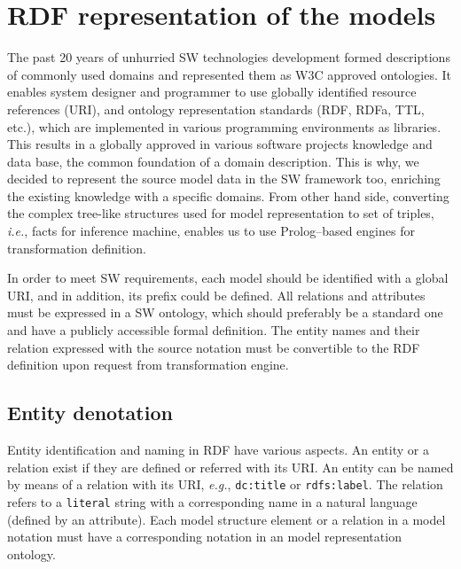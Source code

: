 \documentclass[conference]{IEEEtran} \IEEEoverridecommandlockouts
\begin{document}
\section{RDF representation of the models} \label{sec:rdf-repr} 

The past 20 years of unhurried SW technologies development formed descriptions of commonly used domains and represented them as W3C approved ontologies. It enables system designer and programmer to use globally identified resource references (URI), and ontology representation standards (RDF, RDFa, TTL, etc.), which are implemented in various programming environments as libraries. This results in a globally approved in various software projects knowledge and data base, the common foundation of a domain description. This is why, we decided to represent the source model data in the SW framework too, enriching the existing knowledge with a specific domains. From other hand side, converting the complex tree-like structures used for model representation to set of triples, \emph{i.e.}, facts for inference machine, enables us to use Prolog--based engines for transformation definition. 

In order to meet SW requirements, each model should be identified with a global URI, and in addition, its prefix could be defined. All relations and attributes must be expressed in a SW ontology, which should preferably be a standard one and have a publicly accessible formal definition. The entity names and their relation expressed with the source notation must be convertible to the RDF definition upon request from transformation engine. 

\subsection{Entity denotation} \label{sec:ent-def} 

Entity identification and naming in RDF have various aspects. An entity or a relation exist if they are defined or referred with its URI. An entity can be named by means of a relation with its URI, \emph{e.g.}, \texttt{dc:title} or \texttt{rdfs:label}. The relation refers to a \texttt{literal} string with a corresponding name in a natural language (defined by an attribute). Each model structure element or a relation in a model notation must have a corresponding notation in an model representation ontology. 
\end{document}

